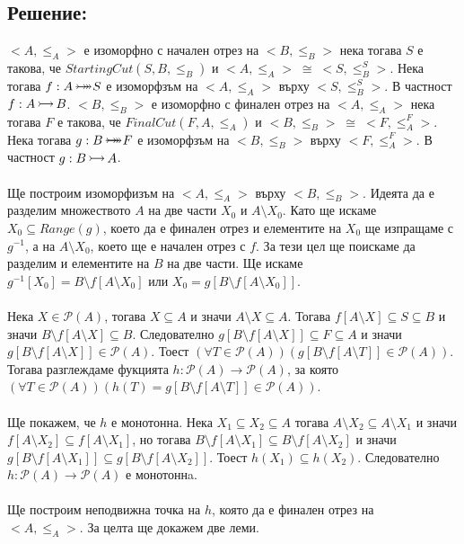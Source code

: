 \documentclass[12pt]{article}
\newcommand{\injection}[0]{\,\mathlarger{\mathlarger{\rightarrowtail}}\,}
\newcommand{\bijection}[0]{\mathbin{\mathlarger{\mathlarger{\rightarrowtail}} \hspace{-14pt} \mathlarger{\mathlarger{\twoheadrightarrow}}}}
\begin{document}
\subsection*{Решение:}
\(<A, \leq_A>\) е изоморфно с начален отрез на \(<B, \leq_B>\)
нека тогава \(S\) е такова, че \(StartingCut(S, B, \leq_B)\)
и \(<A, \leq_A> \; \cong \; <S, \leq_B^S>\).
Нека тогава \(f : A \bijection S\) е изоморфзъм на \(<A, \leq_A>\) върху \(<S, \leq_B^S>\).
В частност \(f : A \injection B\).
\(<B, \leq_B>\) е изоморфно с финален отрез на \(<A, \leq_A>\)
нека тогава \(F\) е такова, че \(FinalCut(F, A, \leq_A)\)
и \(<B, \leq_B> \; \cong \; <F, \leq_A^F>\).
Нека тогава \(g : B \bijection F\) е изоморфзъм на \(<B, \leq_B>\) върху \(<F, \leq_A^F>\).
В частност \(g : B \injection A\).
\\
\vspace{1mm}
\\
Ще построим изоморфизъм на \(<A, \leq_A>\) върху \(<B, \leq_B>\).
Идеята да е разделим множеството \(A\) на две части \(X_0\) и \(A \setminus X_0\).
Като ще искаме \(X_0 \subseteq Range(g)\), което да е финален отрез и елементите на \(X_0\) ще изпращаме с \(g^{-1}\),
а на \(A \setminus X_0\), което ще е начален отрез с \(f\).
За тези цел ще поискаме да разделим и елементите на \(B\) на две части.
Ще искаме
\\
\(g^{-1}[X_0] = B \setminus f[A \setminus X_0]\) или \(X_0 = g[B \setminus f[A \setminus X_0]]\).
\\
\vspace{1mm}
\\
Нека \(X \in \mathcal{P}(A)\), тогава \(X \subseteq A\) и значи \(A \setminus X \subseteq A\).
Тогава \(f[A \setminus X] \subseteq S \subseteq B\) и значи \(B \setminus f[A \setminus X] \subseteq B\).
Следователно \(g[B \setminus f[A \setminus X]] \subseteq F \subseteq A\) и значи
\(g[B \setminus f[A \setminus X]] \in \mathcal{P}(A)\).
Тоест \((\forall T \in \mathcal{P}(A))(g[B \setminus f[A \setminus T]] \in \mathcal{P}(A))\).
Тогава разглеждаме фукцията \(h : \mathcal{P}(A) \to \mathcal{P}(A)\), за която
\\
\((\forall T \in \mathcal{P}(A))(h(T) = g[B \setminus f[A \setminus T]] \in \mathcal{P}(A))\).
\\
\vspace{1mm}
\\
Ще покажем, че \(h\) е монотонна.
Нека \(X_1 \subseteq X_2 \subseteq A\) тогава \(A \setminus X_2 \subseteq A \setminus X_1\)
и значи \(f[A \setminus X_2] \subseteq f[A \setminus X_1]\), но тогава
\(B \setminus f[A \setminus X_1] \subseteq B \setminus f[A \setminus X_2]\)
и значи \(g[B \setminus f[A \setminus X_1]] \subseteq g[B \setminus f[A \setminus X_2]]\).
Тоест \(h(X_1) \subseteq h(X_2)\). Следователно \(h : \mathcal{P}(A) \to \mathcal{P}(A)\) е монотоннa.
\\
\vspace{1mm}
\\
Ще построим неподвижна точка на \(h\), която да е финален отрез на
\\
\(<A, \leq_A>\). За целта ще докажем две леми.
\end{document}
